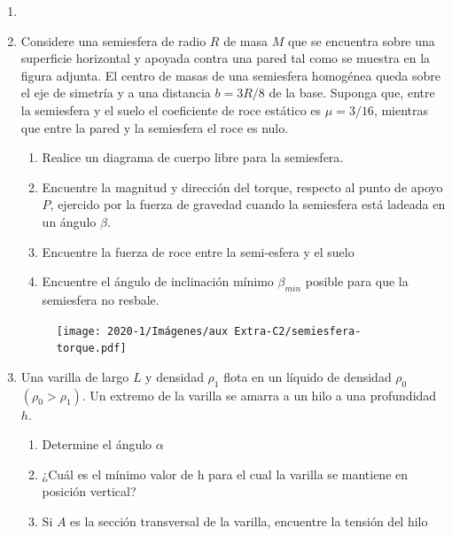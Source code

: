 \documentclass[letterpaper,11pt]{article}
\begin{document}
\vspace{-1cm}
\begin{enumerate}\setlength{\itemsep}{0.4cm}


\item[]

\item Considere una semiesfera de radio $R$ de masa $M$ que se encuentra sobre una superficie horizontal y apoyada contra una pared tal como se muestra en la figura adjunta. El centro de masas de una semiesfera homogénea queda sobre el eje de simetría y a una distancia ${b} = 3 R / 8$ de la base. Suponga que, entre la semiesfera y el suelo el coeficiente de roce estático es $\mu = 3 / 16$, mientras que entre la pared y la semiesfera el roce es nulo.

\begin{multicols}{2}
    \begin{enumerate}
        \item Realice un diagrama de cuerpo libre para la semiesfera.
        \item Encuentre la magnitud y dirección del torque, respecto al punto de apoyo $P$, ejercido por la fuerza de gravedad cuando la semiesfera está ladeada en un ángulo $\beta$.
        \item Encuentre la fuerza de roce entre la semi-esfera y el suelo
        \item Encuentre el ángulo de inclinación mínimo $\beta_{min}$ posible para que la semiesfera no resbale.
    \end{enumerate}
    
    \columnbreak
    
    \begin{figure}[H]
        \centering
        \texttt{[image: 2020-1/Imágenes/aux Extra-C2/semiesfera-torque.pdf]}
    \end{figure}
\end{multicols}

\item Una varilla de largo $L$ y densidad $\rho_1$ flota en un líquido de densidad $\rho_0$ $\left(\rho_0 > \rho_1\right)$. Un extremo de la varilla se amarra a un hilo a una profundidad $h$.

\begin{multicols}{2}
    \begin{enumerate}
        \item Determine el ángulo $\alpha$
        \item ¿Cuál es el mínimo valor de h para el cual la varilla se mantiene en posición vertical?
        \item Si $A$ es la sección transversal de la varilla, encuentre la tensión del hilo
    \end{enumerate}
    

\end{multicols}
\end{enumerate}
\end{document}
